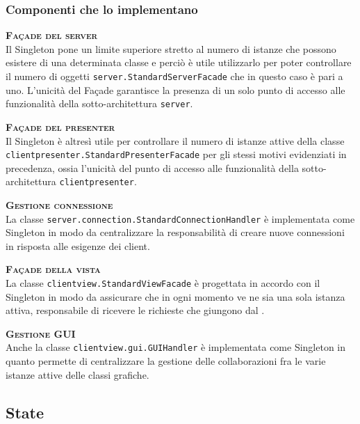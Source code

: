\subsubsection{Componenti che lo implementano}
\begin{description}
  \item{\scshape\bfseries Façade del server}\\
Il  Singleton pone un limite superiore stretto al numero di istanze che possono esistere di una determinata classe e perciò è utile utilizzarlo per poter controllare il numero di oggetti \texttt{server.StandardServerFacade} che in questo caso è pari a uno. L'unicità del Façade garantisce la presenza di un solo punto di accesso alle funzionalità della sotto-architettura \texttt{server}.
  \item{\scshape\bfseries Façade del presenter}\\
Il  Singleton è altresì utile per controllare il numero di istanze attive della classe \texttt{clientpresenter.StandardPresenterFacade} per gli stessi motivi evidenziati in precedenza, ossia l'unicità del punto di accesso alle funzionalità della sotto-architettura \texttt{clientpresenter}.
  \item{\scshape\bfseries Gestione connessione}\\
La classe \texttt{server.connection.StandardConnectionHandler} è implementata come Singleton in modo da centralizzare la responsabilità di creare nuove connessioni in risposta alle esigenze dei client.
  \item{\scshape\bfseries Façade della vista}\\
La classe \texttt{clientview.StandardViewFacade} è progettata in accordo con il  Singleton in modo da assicurare che in ogni momento ve ne sia una sola istanza attiva, responsabile di ricevere le richieste che giungono dal .
  \item{\scshape\bfseries Gestione GUI}\\
Anche la classe \texttt{clientview.gui.GUIHandler} è implementata come Singleton in quanto permette di centralizzare la gestione delle collaborazioni fra le varie istanze attive delle classi grafiche.
\end{description}

\subsection{State}

